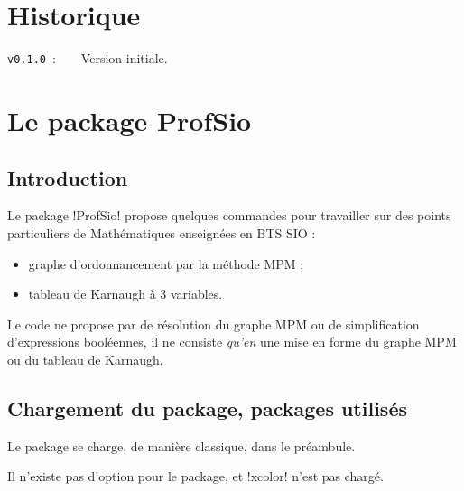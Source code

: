 \documentclass[french,a4paper,11pt]{article}
\begin{document}
\tableofcontents

\vfill

\section{Historique}

\verb|v0.1.0|~:~~~~Version initiale.

\newpage

\section{Le package ProfSio}

\subsection{Introduction}

\begin{noteblock}
Le package \packagetex!ProfSio! propose quelques commandes pour travailler sur des points particuliers de Mathématiques enseignées en BTS SIO :

\begin{itemize}
	\item graphe d'ordonnancement par la méthode MPM ;
	\item tableau de Karnaugh à 3 variables.
\end{itemize}
\vspace*{-\baselineskip}\leavevmode
\end{noteblock}

\begin{warningblock}
Le code ne propose par de \og résolution \fg{} du graphe MPM ou de \og simplification \fg{} d'expressions booléennes, il ne consiste \textit{qu'en} une mise en forme du graphe MPM ou du tableau de Karnaugh.
\end{warningblock}

\subsection{Chargement du package, packages utilisés}

\begin{importantblock}
Le package se charge, de manière classique, dans le préambule.

Il n'existe pas d'option pour le package, et \packagetex!xcolor! n'est pas chargé.
\end{importantblock}

\end{document}
